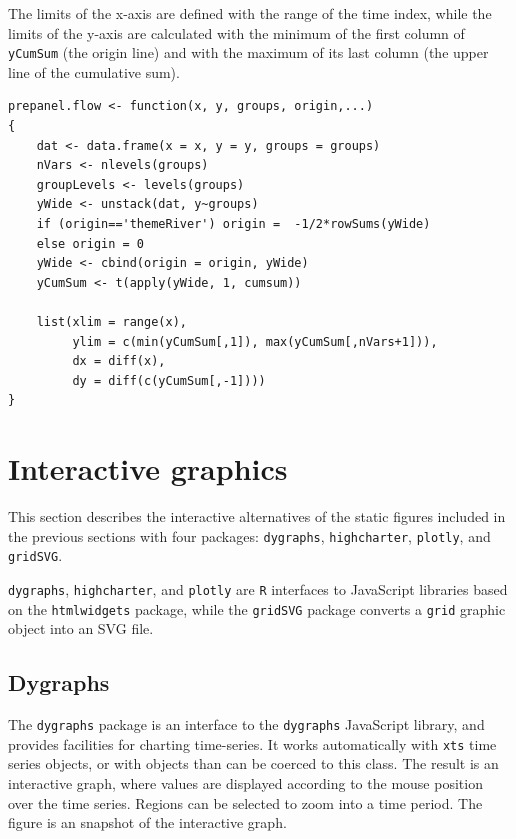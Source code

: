 \documentclass[smallroyalvopaper]{memoir}
\begin{document}
The limits of the x-axis are defined with the range of the time index,
while the limits of the y-axis are calculated with the minimum of the
first column of \texttt{yCumSum} (the origin line) and with the maximum of
its last column (the upper line of the cumulative sum).

\lstset{language=r,label= ,caption= ,captionpos=b,numbers=none}
\begin{lstlisting}
prepanel.flow <- function(x, y, groups, origin,...)
{
    dat <- data.frame(x = x, y = y, groups = groups)
    nVars <- nlevels(groups)
    groupLevels <- levels(groups)
    yWide <- unstack(dat, y~groups)
    if (origin=='themeRiver') origin =  -1/2*rowSums(yWide)
    else origin = 0
    yWide <- cbind(origin = origin, yWide)
    yCumSum <- t(apply(yWide, 1, cumsum))
    
    list(xlim = range(x),
         ylim = c(min(yCumSum[,1]), max(yCumSum[,nVars+1])),
         dx = diff(x),
         dy = diff(c(yCumSum[,-1])))
}
\end{lstlisting}


\section{Interactive graphics \label{sec:interactive_horizontal}}
\label{sec:orgf248422}
This section describes the interactive alternatives of the static
figures included in the previous sections with four packages:
\texttt{dygraphs}, \texttt{highcharter}, \texttt{plotly}, and \texttt{gridSVG}.

\texttt{dygraphs}, \texttt{highcharter}, and \texttt{plotly} are \texttt{R} interfaces to
JavaScript libraries based on the \texttt{htmlwidgets} package, while the
\texttt{gridSVG} package converts a \texttt{grid} graphic object into an SVG file.

\subsection{Dygraphs \label{sec:dygraphs}}
\label{sec:org7b2fa2e}
The \texttt{dygraphs} package is an interface to the \texttt{dygraphs} JavaScript
library, and provides facilities for charting time-series. It works
automatically with \texttt{xts} time series objects, or with objects than can
be coerced to this class. The result is an interactive graph, where
values are displayed according to the mouse position over the time
series. Regions can be selected to zoom into a time period. The figure
\label{fig:dygraphs} is an snapshot of the interactive graph.
\end{document}
